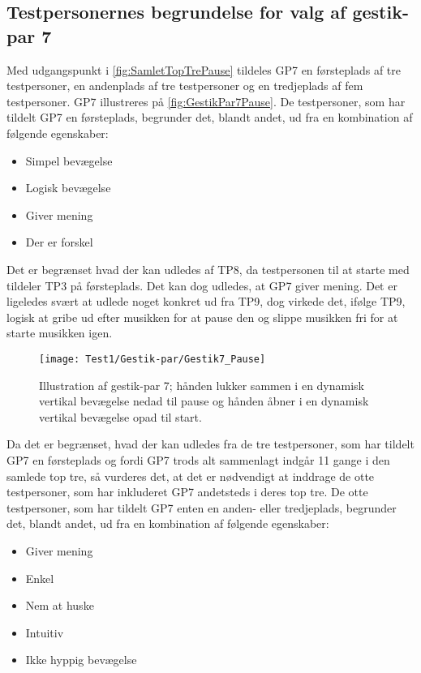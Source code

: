 \subsection{Testpersonernes begrundelse for valg af gestik-par 7}
\label{TestresultaterValgAfGestikkerBegrundelseGP7}
%
Med udgangspunkt i \autoref{fig:SamletTopTrePause} tildeles GP7 en førsteplads af tre testpersoner, en andenplads af tre testpersoner og en tredjeplads af fem testpersoner. GP7 illustreres på \autoref{fig:GestikPar7Pause}. De testpersoner, som har tildelt GP7 en førsteplads, begrunder det, blandt andet, ud fra en kombination af følgende egenskaber: 
%
\begin{multicols}{3}
    \begin{itemize}
        \item Simpel bevægelse
        \item Logisk bevægelse
        \item Giver mening
        \item Der er forskel 
\end{itemize}
\end{multicols}
\noindent
%
Det er begrænset hvad der kan udledes af TP8, da testpersonen til at starte med tildeler TP3 på førsteplads. Det kan dog udledes, at GP7 giver mening. Det er ligeledes svært at udlede noget konkret ud fra TP9, dog virkede det, ifølge TP9, logisk at gribe ud efter musikken for at pause den og slippe musikken fri for at starte musikken igen.
%
\begin{figure}[H]
	\centering
	\texttt{[image: Test1/Gestik-par/Gestik7\_Pause]}
	\caption{Illustration af gestik-par 7; hånden lukker sammen i en dynamisk vertikal bevægelse nedad til pause og hånden åbner i en dynamisk vertikal bevægelse opad til start.}
	\label{fig:GestikPar7Pause}
\end{figure}
\noindent
%
Da det er begrænset, hvad der kan udledes fra de tre testpersoner, som har tildelt GP7 en førsteplads og fordi GP7 trods alt sammenlagt indgår 11 gange i den samlede top tre, så vurderes det, at det er nødvendigt at inddrage de otte testpersoner, som har inkluderet GP7 andetsteds i deres top tre. De otte testpersoner, som har tildelt GP7 enten en anden- eller tredjeplads, begrunder det, blandt andet, ud fra en kombination af følgende egenskaber: 
%
\begin{multicols}{3}
    \begin{itemize}
        \item Giver mening
        \item Enkel
        \item Nem at huske
        \item Intuitiv
        \item Ikke hyppig bevægelse
\end{itemize}
\end{multicols}
